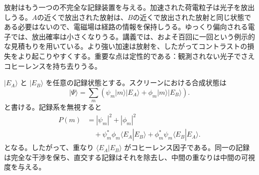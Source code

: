 \begin{classroomqa}
\end{classroomqa}

放射はもう一つの不完全な記録装置を与える。加速された荷電粒子は光子を放出しうる。\(A\)の近くで放出された放射は、\(B\)の近くで放出された放射と同じ状態である必要はないので、電磁場は経路の情報を保持しうる。ゆっくり偏向される電子では、放出確率は小さくなりうる。講義では、およそ百回に一回という例示的な見積もりを用いている。より強い加速は放射を、したがってコントラストの損失をより起こりやすくする。重要な点は定性的である：観測されない光子でさえコヒーレンスを持ち去りうる。

\begin{classroomqa}
\end{classroomqa}

\begin{classroomqa}
\end{classroomqa}

\(|E_A\rangle\) と \(|E_B\rangle\) を任意の記録状態とする。スクリーンにおける合成状態は
\begin{equation}
|\Psi\rangle
=\sum_m\left(
\psi_m|m\rangle|E_A\rangle
+\phi_m|m\rangle|E_B\rangle
\right).
\end{equation}
と書ける。記録系を無視すると
\begin{align}
P(m)
&=|\psi_m|^2+|\phi_m|^2 \\
&\quad
+\psi_m^*\phi_m\langle E_A|E_B\rangle
+\phi_m^*\psi_m\langle E_B|E_A\rangle.
\end{align}
となる。したがって、重なり \(\langle E_A|E_B\rangle\) がコヒーレンス因子である。同一の記録は完全な干渉を保ち、直交する記録はそれを除去し、中間の重なりは中間の可視度を与える。

